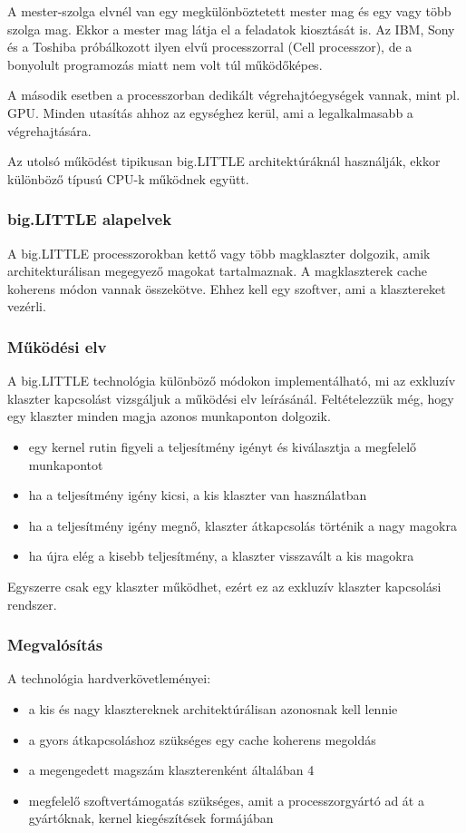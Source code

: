A mester-szolga elvnél van egy megkülönböztetett mester mag és egy vagy több szolga mag.
Ekkor a mester mag látja el a feladatok kiosztását is.
Az IBM, Sony és a Toshiba próbálkozott ilyen elvű processzorral (Cell processzor), de a bonyolult programozás miatt nem volt túl működőképes.

A második esetben a processzorban dedikált végrehajtóegységek vannak, mint pl. GPU.
Minden utasítás ahhoz az egységhez kerül, ami a legalkalmasabb a végrehajtására.

Az utolsó működést tipikusan big.LITTLE architektúráknál használják, ekkor különböző típusú CPU-k működnek együtt.

\subsubsection{big.LITTLE alapelvek}
A big.LITTLE processzorokban kettő vagy több magklaszter dolgozik, amik architekturálisan megegyező magokat tartalmaznak.
A magklaszterek cache koherens módon vannak összekötve.
Ehhez kell egy szoftver, ami a klasztereket vezérli.

\subsubsection{Működési elv}
A big.LITTLE technológia különböző módokon implementálható, mi az exkluzív klaszter kapcsolást vizsgáljuk a működési elv leírásánál.
Feltételezzük még, hogy egy klaszter minden magja azonos munkaponton dolgozik.
\begin{itemize}
    \item egy kernel rutin figyeli a teljesítmény igényt és kiválasztja a megfelelő munkapontot
    \item ha a teljesítmény igény kicsi, a kis klaszter van használatban
    \item ha a teljesítmény igény megnő, klaszter átkapcsolás történik a nagy magokra
    \item ha újra elég a kisebb teljesítmény, a klaszter visszavált a kis magokra
\end{itemize}
Egyszerre csak egy klaszter működhet, ezért ez az exkluzív klaszter kapcsolási rendszer.

\subsubsection{Megvalósítás}
A technológia hardverkövetleményei:
\begin{itemize}
    \item a kis és nagy klasztereknek architektúrálisan azonosnak kell lennie
    \item a gyors átkapcsoláshoz szükséges egy cache koherens megoldás
    \item a megengedett magszám klaszterenként általában 4
    \item megfelelő szoftvertámogatás szükséges, amit a processzorgyártó ad át a gyártóknak, kernel kiegészítések formájában
\end{itemize}

